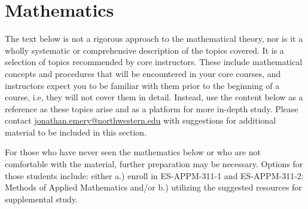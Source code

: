 \section{Mathematics}

The text below is not a rigorous approach to the mathematical theory, nor is it a wholly systematic or comprehensive description of the topics covered. It is a selection of topics recommended by core instructors. These include mathematical concepts and procedures that will be encountered in your core courses, and instructors expect you to be familiar with them prior to the beginning of a course, i.e, they will not cover them in detail. Instead, use the content below as a reference as these topics arise and as a platform for more in-depth study. Please contact \href{mailto:jonathan.emery@northwestern.edu}{jonathan.emery@northwestern.edu} with suggestions for additional material to be included in this section.

For those who have never seen the mathematics below or who are not comfortable with the material, further preparation may be necessary. Options for those students include: either a.) enroll in ES-APPM-311-1 and ES-APPM-311-2: Methods of Applied Mathematics and/or b.) utilizing the suggested resources for supplemental study.

\pagebreak
 \pagebreak
 \pagebreak
 \pagebreak
 \pagebreak
 \pagebreak


